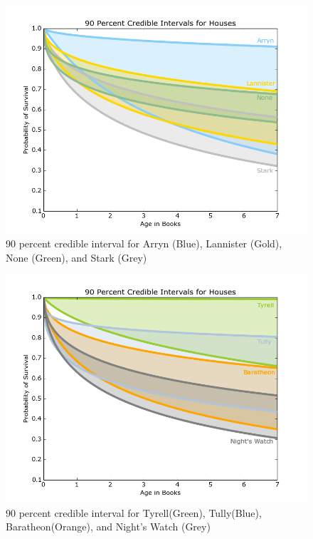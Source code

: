 \documentclass{article}
\begin{document}
\begin{figure}[ht!]
\centering
\includegraphics[width=4.8in]{House1.png}
\caption{90 percent credible interval for Arryn (Blue), Lannister (Gold), None (Green), and Stark (Grey)}
\label{fig:house1}
\end{figure}

\begin{figure}[ht!]
\centering
\includegraphics[width=4.8in]{Houses2.png}
\caption{90 percent credible interval for Tyrell(Green), Tully(Blue), Baratheon(Orange), and Night's Watch (Grey)}
\label{fig:house2}
\end{figure}
\end{document}
